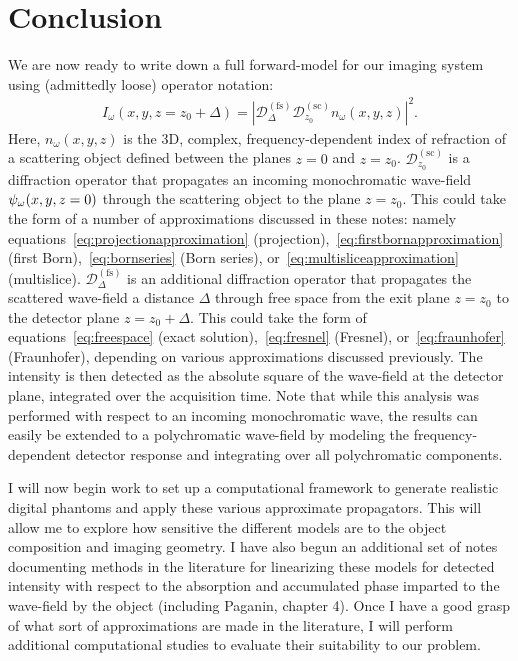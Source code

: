 \documentclass{article}
\begin{document}
\section{Conclusion}

We are now ready to write down a full forward-model for our imaging system using
(admittedly loose) operator notation:
\begin{align}
  I_{\omega}(x,y,z=z_0 + \Delta) = \left|\mathcal{D}^{(\text{fs})}_{\Delta}\mathcal{D}^{(\text{sc})}_{z_0}n_{\omega}(x,y,z)\right|^2. 
\end{align}
Here, $n_{\omega}(x,y,z)$ is the 3D, complex, frequency-dependent index of
refraction of a scattering object defined between the planes $z=0$ and
$z=z_0$. $\mathcal{D}_{z_0}^{(\text{sc})}$ is a diffraction operator that
propagates an incoming monochromatic wave-field $\psi_{\omega}(x,y,z=0)$ through the
scattering object to the plane $z=z_0$. This could take the form of a number of
approximations discussed in these notes: namely
equations~\ref{eq:projectionapproximation}
(projection),~\ref{eq:firstbornapproximation} (first Born),~\ref{eq:bornseries}
(Born series), or~\ref{eq:multisliceapproximation}
(multislice). $\mathcal{D}_{\Delta}^{(\text{fs})}$ is an additional diffraction
operator that propagates the scattered wave-field a distance $\Delta$ through
free space from the exit plane $z=z_0$ to the detector plane $z=z_0 + \Delta$.
This could take the form of equations~\ref{eq:freespace} (exact
solution),~\ref{eq:fresnel} (Fresnel), or~\ref{eq:fraunhofer} (Fraunhofer),
depending on various approximations discussed previously. The intensity is then
detected as the absolute square of the wave-field at the detector plane,
integrated over the acquisition time. Note that while this analysis was
performed with respect to an incoming monochromatic wave, the results can easily
be extended to a polychromatic wave-field by modeling the frequency-dependent
detector response and integrating over all polychromatic components.

I will now begin work to set up a computational framework to generate realistic
digital phantoms and apply these various approximate propagators.  This will
allow me to explore how sensitive the different models are to the object
composition and imaging geometry. I have also begun an additional set of notes
documenting methods in the literature for linearizing these models for detected
intensity with respect to the absorption and accumulated phase imparted to the
wave-field by the object (including Paganin, chapter 4). Once I have a good
grasp of what sort of approximations are made in the literature, I will perform
additional computational studies to evaluate their suitability to our problem.
\end{document}
